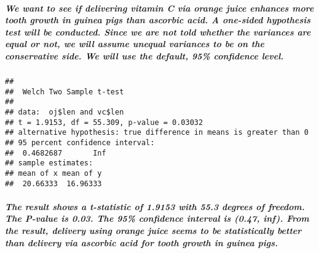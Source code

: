 \documentclass[
]{article}
\newenvironment{Shaded}{\begin{snugshade}}{\end{snugshade}}
\newcommand{\AttributeTok}[1]{\textcolor[rgb]{0.77,0.63,0.00}{#1}}
\newcommand{\ConstantTok}[1]{\textcolor[rgb]{0.00,0.00,0.00}{#1}}
\newcommand{\FunctionTok}[1]{\textcolor[rgb]{0.00,0.00,0.00}{#1}}
\newcommand{\NormalTok}[1]{#1}
\newcommand{\SpecialCharTok}[1]{\textcolor[rgb]{0.00,0.00,0.00}{#1}}
\newcommand{\StringTok}[1]{\textcolor[rgb]{0.31,0.60,0.02}{#1}}
\begin{document}
\hypertarget{we-want-to-see-if-delivering-vitamin-c-via-orange-juice-enhances-more-tooth-growth-in-guinea-pigs-than-ascorbic-acid.-a-one-sided-hypothesis-test-will-be-conducted.-since-we-are-not-told-whether-the-variances-are-equal-or-not-we-will-assume-unequal-variances-to-be-on-the-conservative-side.-we-will-use-the-default-95-confidence-level.}{%
\subparagraph{We want to see if delivering vitamin C via orange juice
enhances more tooth growth in guinea pigs than ascorbic acid. A
one-sided hypothesis test will be conducted. Since we are not told
whether the variances are equal or not, we will assume unequal variances
to be on the conservative side. We will use the default, 95\% confidence
level.}\label{we-want-to-see-if-delivering-vitamin-c-via-orange-juice-enhances-more-tooth-growth-in-guinea-pigs-than-ascorbic-acid.-a-one-sided-hypothesis-test-will-be-conducted.-since-we-are-not-told-whether-the-variances-are-equal-or-not-we-will-assume-unequal-variances-to-be-on-the-conservative-side.-we-will-use-the-default-95-confidence-level.}}

\begin{Shaded}
\end{Shaded}

\begin{verbatim}
## 
##  Welch Two Sample t-test
## 
## data:  oj$len and vc$len
## t = 1.9153, df = 55.309, p-value = 0.03032
## alternative hypothesis: true difference in means is greater than 0
## 95 percent confidence interval:
##  0.4682687       Inf
## sample estimates:
## mean of x mean of y 
##  20.66333  16.96333
\end{verbatim}

\hypertarget{the-result-shows-a-t-statistic-of-1.9153-with-55.3-degrees-of-freedom.-the-p-value-is-0.03.-the-95-confidence-interval-is-0.47-inf.-from-the-result-delivery-using-orange-juice-seems-to-be-statistically-better-than-delivery-via-ascorbic-acid-for-tooth-growth-in-guinea-pigs.}{%
\subparagraph{The result shows a t-statistic of 1.9153 with 55.3 degrees
of freedom. The P-value is 0.03. The 95\% confidence interval is (0.47,
inf). From the result, delivery using orange juice seems to be
statistically better than delivery via ascorbic acid for tooth growth in
guinea
pigs.}\label{the-result-shows-a-t-statistic-of-1.9153-with-55.3-degrees-of-freedom.-the-p-value-is-0.03.-the-95-confidence-interval-is-0.47-inf.-from-the-result-delivery-using-orange-juice-seems-to-be-statistically-better-than-delivery-via-ascorbic-acid-for-tooth-growth-in-guinea-pigs.}}
\end{document}
